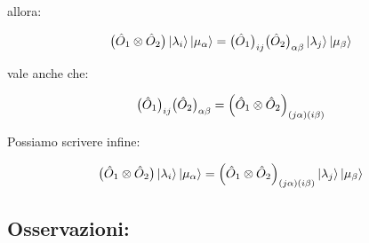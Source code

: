 	allora:
	
\begin{align*}
	\qty\big(\hat{O}_1 \otimes \hat{O}_2) \ket{\lambda_i} \ket{\mu_{\alpha}} = \qty\big(\hat{O}_1)_{ij} \qty\big(\hat{O}_2)_{\alpha \beta} \ket{\lambda_j}\ket{\mu_{\beta}}
\end{align*}

	vale anche che:
	
\begin{align*}
	\qty\big(\hat{O}_1)_{ij} \qty\big(\hat{O}_2)_{\alpha \beta} = \qty(\hat{O}_1 \otimes \hat{O}_2)_{\qty(j\alpha) \qty(i \beta)}
\end{align*}

	Possiamo scrivere infine:
	
\begin{align*}
	\qty\big(\hat{O}_1 \otimes \hat{O}_2) \ket{\lambda_i} \ket{\mu_{\alpha}} = \qty(\hat{O}_1 \otimes \hat{O}_2)_{\qty(j\alpha) \qty(i \beta)} \ket{\lambda_j} \ket{\mu_{\beta}}
\end{align*}

\subsection{Osservazioni:}

